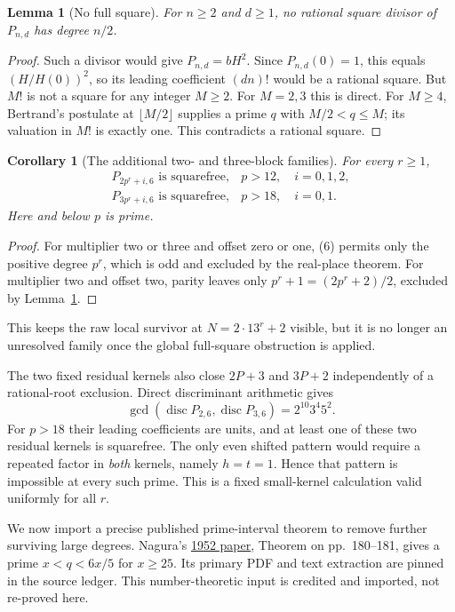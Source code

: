 \documentclass[11pt]{article}
\newtheorem{lemma}[theorem]{Lemma}
\newtheorem{corollary}[theorem]{Corollary}
\begin{document}
\begin{lemma}[No full square]\label{lem:fullsquare}
For $n\ge2$ and $d\ge1$, no rational square divisor of $P_{n,d}$
has degree $n/2$.
\end{lemma}
\begin{proof}
Such a divisor would give $P_{n,d}=bH^2$. Since $P_{n,d}(0)=1$,
this equals $(H/H(0))^2$, so its leading coefficient $(dn)!$ would
be a rational square. But $M!$ is not a square for any integer $M\ge2$.
For $M=2,3$ this is direct. For $M\ge4$, Bertrand's postulate at
$\lfloor M/2\rfloor$ supplies a prime $q$ with $M/2<q\le M$;
its valuation in $M!$ is exactly one. This contradicts a rational square.
\end{proof}

\begin{corollary}[The additional two- and three-block families]\label{cor:userblocks}
For every $r\ge1$,
\[
 \begin{array}{ll}
 P_{2p^r+i,6}\text{ is squarefree},&p>12,\quad i=0,1,2,\\
 P_{3p^r+i,6}\text{ is squarefree},&p>18,\quad i=0,1.
 \end{array} \tag{9}
\]
Here and below $p$ is prime.
\end{corollary}
\begin{proof}
For multiplier two or three and offset zero or one, (6) permits only
the positive degree $p^r$, which is odd and excluded by the real-place
theorem. For multiplier two and offset two, parity leaves only
$p^r+1=(2p^r+2)/2$, excluded by Lemma~\ref{lem:fullsquare}.
\end{proof}
This keeps the raw local survivor at $N=2\cdot13^r+2$ visible, but
it is no longer an unresolved family once the global full-square
obstruction is applied.

The two fixed residual kernels also close $2P+3$ and $3P+2$
independently of a rational-root exclusion. Direct discriminant arithmetic gives
\[
 \gcd\!\left(\operatorname{disc}P_{2,6},
                 \operatorname{disc}P_{3,6}\right)
       =2^{10}3^4 5^2. \tag{9a}
\]
For $p>18$ their leading coefficients are units, and at least one of
these two residual kernels is squarefree. The only even shifted pattern
would require a repeated factor in \emph{both} kernels, namely
$h=t=1$. Hence that pattern is impossible at every such prime.
This is a fixed small-kernel calculation valid uniformly for all $r$.

We now import a precise published prime-interval theorem to remove
further surviving large degrees. Nagura's
\href{sources/nagura-1952-prime-interval.pdf}{1952 paper}, Theorem on
pp.~180--181, gives a prime $x<q<6x/5$ for $x\ge25$.
Its primary PDF and text extraction are pinned in the source ledger.
This number-theoretic input is credited and imported, not re-proved here.
\end{document}
